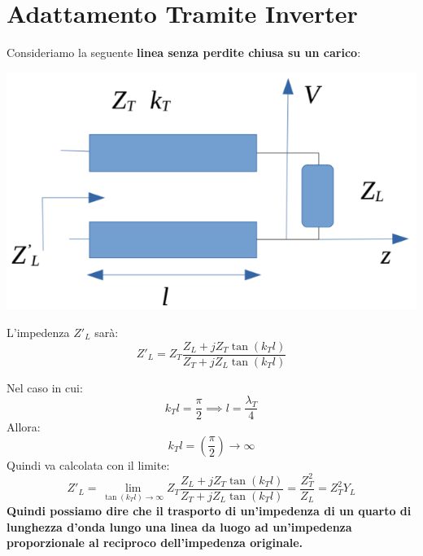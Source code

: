 \section{Adattamento Tramite Inverter}
Consideriamo la seguente \textbf{linea senza perdite chiusa su un carico}:
\begin{center}
    \includegraphics[width=.6\textwidth]{Images/figure43.png}
\end{center}
L'impedenza $Z'_L$ sarà:
\begin{equation*}
    Z'_L = Z_T \frac{Z_L + j Z_T \tan(k_T l)}{Z_T + j Z_L \tan(k_T l)}
\end{equation*}

Nel caso in cui:
\begin{equation*}
    k_T l = \frac{\pi}{2} \implies l = \frac{\lambda_T}{4}
\end{equation*}
Allora:
\begin{equation*}
    k_T l = \left(\frac{\pi}{2}\right) \longrightarrow \infty
\end{equation*}
Quindi va calcolata con il limite:
\begin{equation*}
    Z'_L = \lim\limits_{\tan(k_T l) \longrightarrow \infty} Z_T \frac{Z_L + j Z_T \tan(k_T l)}{Z_T + j Z_L \tan(k_T l)} = \frac{Z_T^2}{Z_L} = Z_T^2 Y_L
\end{equation*}
\textbf{Quindi possiamo dire che il trasporto di un'impedenza di un quarto di lunghezza d'onda lungo una linea da luogo ad un'impedenza proporzionale al reciproco dell'impedenza originale.}




